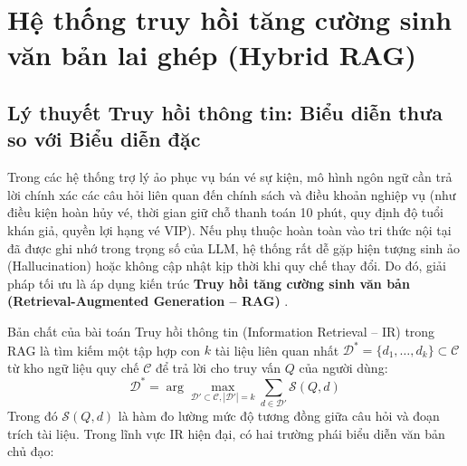 \section{Hệ thống truy hồi tăng cường sinh văn bản lai ghép (Hybrid RAG)}
\label{sec:theory_hybrid_rag}

\subsection{Lý thuyết Truy hồi thông tin: Biểu diễn thưa so với Biểu diễn đặc}

Trong các hệ thống trợ lý ảo phục vụ bán vé sự kiện, mô hình ngôn ngữ cần trả lời chính xác các câu hỏi liên quan đến chính sách và điều khoản nghiệp vụ (như điều kiện hoàn hủy vé, thời gian giữ chỗ thanh toán 10 phút, quy định độ tuổi khán giả, quyền lợi hạng vé VIP). Nếu phụ thuộc hoàn toàn vào tri thức nội tại đã được ghi nhớ trong trọng số của LLM, hệ thống rất dễ gặp hiện tượng sinh ảo (Hallucination) hoặc không cập nhật kịp thời khi quy chế thay đổi. Do đó, giải pháp tối ưu là áp dụng kiến trúc \textbf{Truy hồi tăng cường sinh văn bản (Retrieval-Augmented Generation -- RAG)} \cite{rag_lewis_2020}.

Bản chất của bài toán Truy hồi thông tin (Information Retrieval -- IR) trong RAG là tìm kiếm một tập hợp con $k$ tài liệu liên quan nhất $\mathcal{D}^* = \{d_1, \dots, d_k\} \subset \mathcal{C}$ từ kho ngữ liệu quy chế $\mathcal{C}$ để trả lời cho truy vấn $Q$ của người dùng:
\begin{equation}
  \mathcal{D}^* = \arg\max_{\mathcal{D}' \subset \mathcal{C}, |\mathcal{D}'|=k} \sum_{d \in \mathcal{D}'} \mathcal{S}(Q, d)
  \label{eq:ir_objective}
\end{equation}
Trong đó $\mathcal{S}(Q, d)$ là hàm đo lường mức độ tương đồng giữa câu hỏi và đoạn trích tài liệu. Trong lĩnh vực IR hiện đại, có hai trường phái biểu diễn văn bản chủ đạo:

